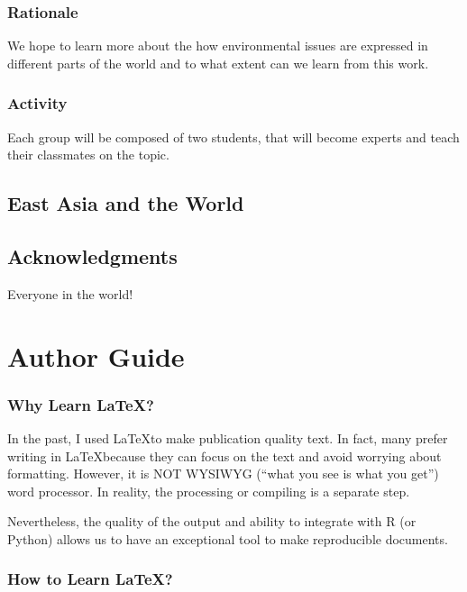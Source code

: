 \documentclass{book}\usepackage{knitr}
\begin{document}
\subsection{Rationale}

We hope to learn more about the how environmental issues are expressed in different parts of the world and to what extent can we learn from this work. 

\subsection{Activity}

Each group will be composed of two students, that will become experts and teach their classmates on the topic. 

\section{East Asia and the World}







\section{Acknowledgments}

Everyone in the world!




\chapter{Author Guide}\label{ch:guide}

\subsection*{Why Learn \LaTeX?}

In the past, I used \LaTeX to make publication quality text. In fact, many prefer writing in \LaTeX because they can focus on the text and avoid worrying about formatting. However, it is NOT WYSIWYG (``what you see is what you get'') word processor. In reality, the processing or compiling is a separate step. 

Nevertheless, the quality of the output and ability to integrate with R (or Python) allows us to have an exceptional tool to make reproducible documents. 

\subsection*{How to Learn \LaTeX?}
\end{document}
